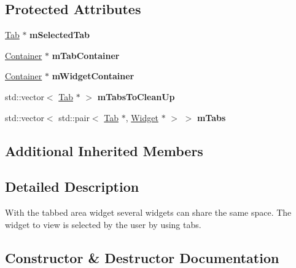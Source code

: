 \subsection*{Protected Attributes}
\begin{DoxyCompactItemize}
\item 
\hyperlink{classgcn_1_1Tab}{Tab} $\ast$ {\bfseries m\+Selected\+Tab}\hypertarget{classgcn_1_1TabbedArea_a1046afb3d40607305377a162a1c57455}{}\label{classgcn_1_1TabbedArea_a1046afb3d40607305377a162a1c57455}

\item 
\hyperlink{classgcn_1_1Container}{Container} $\ast$ {\bfseries m\+Tab\+Container}\hypertarget{classgcn_1_1TabbedArea_a35d3dd92f4335768b3c8660a65f402d0}{}\label{classgcn_1_1TabbedArea_a35d3dd92f4335768b3c8660a65f402d0}

\item 
\hyperlink{classgcn_1_1Container}{Container} $\ast$ {\bfseries m\+Widget\+Container}\hypertarget{classgcn_1_1TabbedArea_aa5f33fdf4dbafb5657d3f5da7eeacc87}{}\label{classgcn_1_1TabbedArea_aa5f33fdf4dbafb5657d3f5da7eeacc87}

\item 
std\+::vector$<$ \hyperlink{classgcn_1_1Tab}{Tab} $\ast$ $>$ {\bfseries m\+Tabs\+To\+Clean\+Up}\hypertarget{classgcn_1_1TabbedArea_a6127cdec0f2e62730ff48889aba32597}{}\label{classgcn_1_1TabbedArea_a6127cdec0f2e62730ff48889aba32597}

\item 
std\+::vector$<$ std\+::pair$<$ \hyperlink{classgcn_1_1Tab}{Tab} $\ast$, \hyperlink{classgcn_1_1Widget}{Widget} $\ast$ $>$ $>$ {\bfseries m\+Tabs}\hypertarget{classgcn_1_1TabbedArea_acb225a940b0c112cd026b00b151460e2}{}\label{classgcn_1_1TabbedArea_acb225a940b0c112cd026b00b151460e2}

\end{DoxyCompactItemize}
\subsection*{Additional Inherited Members}


\subsection{Detailed Description}
With the tabbed area widget several widgets can share the same space. The widget to view is selected by the user by using tabs. 

\subsection{Constructor \& Destructor Documentation}
